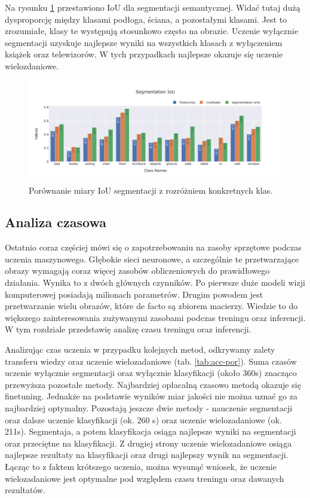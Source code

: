 Na rysunku \ref{fig:segmentation-iou} przestawiono IoU dla segmentacji semantycznej. Widać tutaj dużą dysproporcję między klasami podłoga, ściana, a pozostałymi klasami. Jest to zrozumiałe, klasy te występują stosunkowo często na obrazie. Uczenie wyłącznie segmentacji uzyskuje najlepsze wyniki na wszystkich klasach z wyłączeniem książek oraz telewizorów. W tych przypadkach najlepsze okazuje się uczenie wielozdaniowe.

\begin{figure}[ht!]
    \centering
    \includegraphics[width=\textwidth]{result_imgs_sorted/Segmentation-IoU.jpeg}
    \caption{Porównanie miary IoU segmentacji z rozróżniem konkretnych klas.}
    \label{fig:segmentation-iou}
    
\end{figure}
\subsection{Analiza czasowa}
Ostatnio coraz częściej mówi się o zapotrzebowaniu na zasoby sprzętowe podczas uczenia maszynowego. Głębokie sieci neuronowe, a szczególnie te przetwarzające obrazy wymagają coraz więcej zasobów obliczeniowych do prawidłowego działania. Wynika to z dwóch głównych czynników. Po pierwsze duże modeli wizji komputerowej posiadają milionach parametrów. Drugim powodem jest przetwarzanie wielu obrazów, które de facto są zbiorem macierzy. Wiedzie to do większego zainteresowania zużywanymi zasobami podczas treningu oraz inferencji. W tym rozdziale przedstawię analizę czasu treningu oraz inferencji.

Analizując czas uczenia w przypadku kolejnych metod, odkrywamy zalety transferu wiedzy oraz uczenie wielozadaniowe (tab. \ref{tab:acc-por}). Suma czasów uczenie wyłącznie segmentacji oraz wyłącznie klasyfikacji (około 360s) znacząco przewyższa pozostałe metody. Najbardziej opłacalną czasowo metodą okazuje się finetuning. Jednakże na podstawie wyników miar jakości nie można uznać go za najbardziej optymalny. Pozostają jeszcze dwie metody - nauczenie segmentacji oraz dalsze uczenie klasyfikacji (ok. 260 s) oraz uczenie wielozadaniowe (ok. 211s). Segmentaja, a potem klasyfikacja osiąga najlepsze wyniki na segmentacji oraz przeciętne na klasyfikacji. Z drugiej strony uczenie wielozadaniowe osiąga najlepsze rezultaty na klasyfikacji oraz drugi najlepszy wynik na segmentacji. Łącząc to z faktem krótszego uczenia, można wysunąć wniosek, że uczenie wielozadaniowe jest optymalne pod względem czasu treningu oraz dawanych rezultatów.



